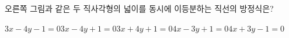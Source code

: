 \noindent\begin{minipage}[t]{0.58\linewidth}\vspace{0pt}오른쪽 그림과 같은 두 직사각형의 넓이를 동시에 이등분하는 직선의 방정식은?\end{minipage}\hfill\begin{minipage}[t]{0.4\linewidth}\vspace{0pt}\centering \end{minipage}\par
\begin{choicesv}{$3x-4y-1=0$}{$3x-4y+1=0$}{$3x+4y+1=0$}{$4x-3y+1=0$}{$4x+3y-1=0$}\end{choicesv}
